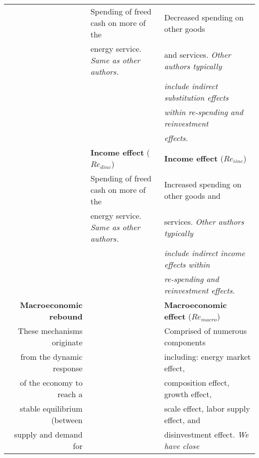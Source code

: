 \begin{table}
\begin{center}
\begin{tabular}{ r l l }
                                   & Spending of freed cash on more of the       & Decreased spending on other goods  \\
                                   & energy service. \emph{Same as other authors.}  & and services. \emph{Other authors typically} \\
                                   &                                             & \emph{include indirect substitution effects} \\
                                   &                                             & \emph{within re-spending and reinvestment} \\ 
                                   &                                             & \emph{effects.} \\ 
                                   \cmidrule{2-3}
                                   & \textbf{Income effect} ($Re_{dinc}$)        & \textbf{Income effect} ($Re_{iinc}$) \\
                                   & Spending of freed cash on more of the       & Increased spending on other goods and \\
                                   & energy service. \emph{Same as other authors.} & services. \emph{Other authors typically} \\
                                   &                                             & \emph{include indirect income effects within} \\ 
                                   &                                             & \emph{re-spending and reinvestment effects.} \\
                                   \cmidrule{2-3}
\textbf{Macroeconomic rebound}     &                                             & \textbf{Macroeconomic effect} ($Re_{macro}$) \\
These mechanisms originate         &                                             & Comprised of numerous components \\
from the dynamic response          &                                             & including: energy market effect, \\
of the economy to reach a          &                                             & composition effect, growth effect, \\
stable equilibrium (between        &                                             & scale effect, labor supply effect, and \\
supply and demand for              &                                             & disinvestment effect. \emph{We have close} \\

\end{tabular}
\end{center}
\end{table}
